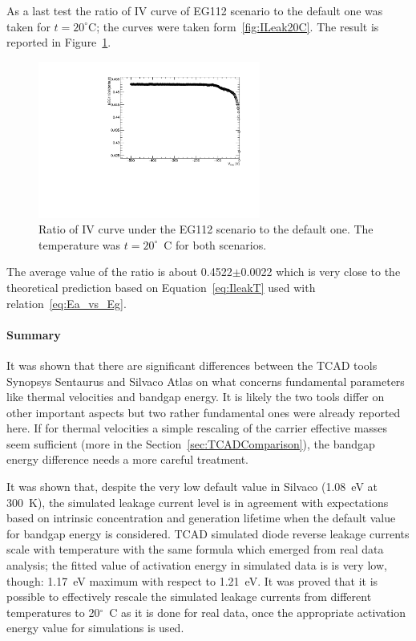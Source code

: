 As  a last test the ratio of IV curve of EG112 scenario to the default one was taken for 
$t=20^{\circ}$C; the curves were taken form~\ref{fig:ILeak20C}. The result is reported in Figure~\ref{fig:EG112_to_default_T_20_Current_ratio}.

\begin{figure}[!htbp]
\centering
\includegraphics[width=0.65\textwidth]{EG112_to_default_T_20_Current_ratio.pdf}
\caption{\label{fig:EG112_to_default_T_20_Current_ratio}Ratio of IV curve under the EG112 
scenario to the default one. The temperature was $t=20^{\circ}$~C for both scenarios.}
\end{figure}

The average value of the ratio is about 0.4522$\pm$0.0022 which is very close to the theoretical 
prediction based on Equation~\ref{eq:IleakT} used with relation~\ref{eq:Ea_vs_Eg}.


\paragraph{Summary}
It was shown that there are significant differences between the  TCAD tools Synopsys Sentaurus and 
Silvaco Atlas on what concerns fundamental parameters like thermal velocities and bandgap energy. It is likely the 
two tools differ on other important aspects but  two rather fundamental ones were already reported here.
If for  thermal velocities a simple rescaling of the carrier effective masses seem sufficient (more in 
the Section~\ref{sec:TCADComparison}), the bandgap energy difference needs a more careful treatment. 

It was shown that, despite the very low default value in Silvaco (1.08~eV at 300~K), the 
simulated leakage current level is in agreement with expectations based on intrinsic concentration 
and generation lifetime when the default value for bandgap energy is considered. TCAD simulated diode reverse leakage currents scale with temperature 
with the same formula which emerged from real data analysis; the fitted value of activation energy 
in simulated data is is very low, though: 1.17~eV maximum with respect to 1.21~eV. 
It was proved that it is possible to effectively rescale the simulated leakage currents from different temperatures to 20$^{\circ}$~C as it is done for real data, once the appropriate activation energy 
value for simulations is used.

